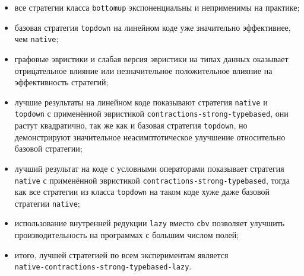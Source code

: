 \documentclass[../thesis.tex]{subfiles}
\begin{document}
\begin{itemize}
    \item все стратегии класса \texttt{bottomup} экспоненциальны и неприменимы на практике; 
    \item базовая стратегия \texttt{topdown} на линейном коде уже значительно эффективнее, чем \texttt{native}; 
    \item графовые эвристики и слабая версия эвристики на типах данных оказывает отрицательное влияние или незначительное положительное влияние на эффективность стратегий;
    \item лучшие результаты на линейном коде показывают стратегия \texttt{native} и \texttt{topdown} с применённой эвристикой \texttt{contractions-strong-typebased}, они растут квадратично, так же как и базовая стратегия \texttt{topdown}, но демонстрируют значительное неасимптотическое улучшение относительно базовой стратегии;
    \item лучший результат на коде с условными операторами показывает стратегия \texttt{native} с применённой эвристикой \texttt{contractions-strong-typebased}, тогда как все стратегии из класса \texttt{topdown} на таком коде хуже даже базовой стратегии \texttt{native};
    \item использование внутренней редукции \texttt{lazy} вместо \texttt{cbv} позволяет улучшить производительность на программах с большим числом полей;
    \item итого, лучшей стратегией по всем экспериментам является \\\texttt{native-contractions-strong-typebased-lazy}.
\end{itemize}
\end{document}
